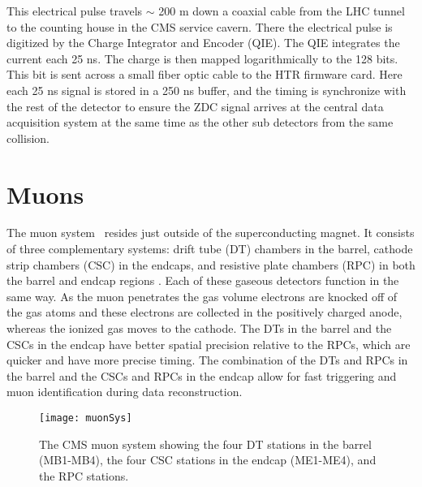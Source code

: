     This electrical pulse travels $\sim$ 200 m down a coaxial cable from the LHC
      tunnel to the counting house in the CMS service cavern. 
    There the electrical pulse is digitized by the Charge Integrator and Encoder 
      (QIE).
    The QIE integrates the current each 25 ns.
    The charge is then mapped logarithmically to the 128 bits. 
    This bit is sent across a small fiber optic cable to the HTR firmware card.
    Here each 25 ns signal is stored in a 250 ns buffer, and the timing is synchronize
      with the rest of the detector to ensure the ZDC signal arrives at the central
      data acquisition system at the same time as the other sub detectors from the 
      same collision. 
    
  \section{Muons}
    The muon system~\cite{tCmsE} resides just outside of the superconducting magnet.
    It consists of three complementary systems: drift tube (DT) chambers in the
      barrel, cathode strip chambers (CSC) in the endcaps, and resistive 
      plate chambers (RPC) in both the barrel and endcap regions \cite{tCmsE}.
    Each of these gaseous detectors function in the same way.
    As the muon penetrates the gas volume electrons are knocked off of the 
      gas atoms and these electrons are collected in the positively charged
      anode, whereas the ionized gas moves to the cathode. 
    The DTs in the barrel and the CSCs in the endcap have better spatial 
      precision relative to the RPCs, which are quicker and have more
      precise timing. 
    The combination of the DTs and RPCs in the barrel and the CSCs and RPCs 
      in the endcap allow for fast triggering and muon identification during
      data reconstruction. 
    \begin{figure}[!Hhbt]
      \centering
      \texttt{[image: muonSys]}
      \caption{ The CMS muon system showing the four DT stations in 
        the barrel (MB1-MB4), the four CSC stations in the endcap (ME1-ME4), 
        and the RPC stations.}
      \label{fig:muonSys}
    \end{figure}

